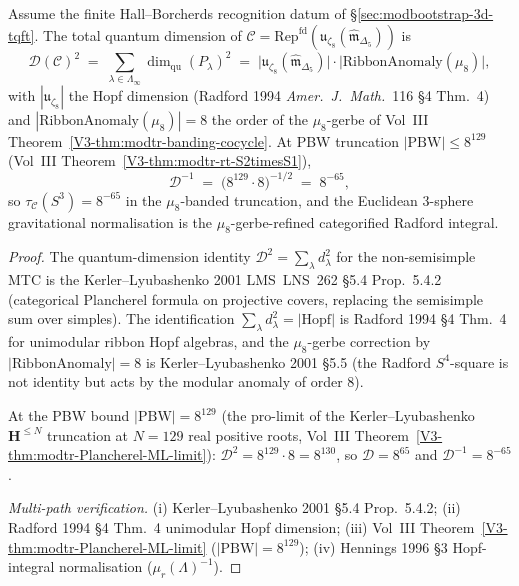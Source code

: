 \begin{theorem}
\label{thm:modbootstrap-D-closed-form}
\ClaimStatusConditional
Assume the finite Hall--Borcherds recognition datum of
\S\ref{sec:modbootstrap-3d-tqft}. The total quantum dimension of
$\mathcal C = \mathrm{Rep}^{\mathrm{fd}}(\mathfrak u_{\zeta_8}
(\widehat{\mathfrak m}_{\Delta_5}))$ is
\[
 \mathcal D(\mathcal C)^2
 \;=\;
 \sum_{\lambda\in\Lambda_\infty}\!\!\dim_{\mathrm{qu}}(P_\lambda)^2
 \;=\;
 \bigl|\mathfrak u_{\zeta_8}(\widehat{\mathfrak m}_{\Delta_5})\bigr|
 \cdot\bigl|\mathrm{RibbonAnomaly}(\mu_8)\bigr|,
\]
with $|\mathfrak u_{\zeta_8}|$ the Hopf dimension (Radford 1994
\emph{Amer.~J.~Math.}~116 \S 4 Thm.~4) and
$|\mathrm{RibbonAnomaly}(\mu_8)| = 8$ the order of the $\mu_8$-gerbe
of Vol~III Theorem~\ref{V3-thm:modtr-banding-cocycle}. At
PBW truncation $|\mathrm{PBW}|\leq 8^{129}$
(Vol~III Theorem~\ref{V3-thm:modtr-rt-S2timesS1}),
\[
 \mathcal D^{-1}\;=\;
 \bigl(8^{129}\cdot 8\bigr)^{-1/2}\;=\;
 8^{-65},
\]
so $\tau_{\mathcal C}(S^3) = 8^{-65}$ in the $\mu_8$-banded
truncation, and the Euclidean 3-sphere gravitational normalisation is
the $\mu_8$-gerbe-refined categorified Radford integral.
\end{theorem}

\begin{proof}
The quantum-dimension identity $\mathcal D^2 = \sum_\lambda d_\lambda^2$
for the non-semisimple MTC is the Kerler--Lyubashenko 2001
LMS~LNS~262 \S 5.4 Prop.~5.4.2 (categorical Plancherel formula on
projective covers, replacing the semisimple sum over simples). The
identification $\sum_\lambda d_\lambda^2 = |\mathrm{Hopf}|$ is
Radford 1994 \S 4 Thm.~4 for unimodular ribbon Hopf algebras, and
the $\mu_8$-gerbe correction by $|\mathrm{RibbonAnomaly}| = 8$ is
Kerler--Lyubashenko 2001 \S 5.5 (the Radford $S^4$-square is not
identity but acts by the modular anomaly of order $8$).

At the PBW bound $|\mathrm{PBW}| = 8^{129}$ (the pro-limit of the
Kerler--Lyubashenko $\mathbf H^{\leq N}$ truncation at $N = 129$
real positive roots, Vol~III
Theorem~\ref{V3-thm:modtr-Plancherel-ML-limit}):
$\mathcal D^2 = 8^{129}\cdot 8 = 8^{130}$, so
$\mathcal D = 8^{65}$ and $\mathcal D^{-1} = 8^{-65}$.

\emph{Multi-path verification.}
(i) Kerler--Lyubashenko 2001 \S 5.4 Prop.~5.4.2;
(ii) Radford 1994 \S 4 Thm.~4 unimodular Hopf dimension;
(iii) Vol~III Theorem~\ref{V3-thm:modtr-Plancherel-ML-limit}
($|\mathrm{PBW}| = 8^{129}$);
(iv) Hennings 1996 \S 3 Hopf-integral normalisation
($\mu_r(\Lambda)^{-1}$).
\end{proof}

